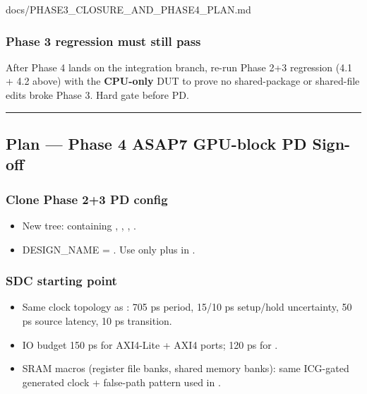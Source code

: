 \begin{relocated}{docs/PHASE3_CLOSURE_AND_PHASE4_PLAN.md}
\subsubsection{Phase 3 regression must still pass}\label{ds:ch:phase3-closure-phase4-plan:66-phase-3-regression-must-still-pass}

After Phase 4 lands on the integration branch, re-run Phase 2+3
regression (4.1 + 4.2 above) with the \textbf{CPU-only} DUT to prove no
shared-package or shared-file edits broke Phase 3. Hard gate before PD.

\begin{center}\rule{0.5\linewidth}{0.5pt}\end{center}

\subsection{Plan --- Phase 4 ASAP7 GPU-block PD Sign-off}\label{ds:ch:phase3-closure-phase4-plan:7-plan-phase-4-asap7-gpu-block-pd-sign-off}

\subsubsection{Clone Phase 2+3 PD config}\label{ds:ch:phase3-closure-phase4-plan:71-clone-phase-23-pd-config}

\begin{itemize}
\tightlist
\item
  New tree:  containing ,
  , ,
  .
\item
  DESIGN\_\allowbreak{}NAME = . Use only
   plus  in .
\end{itemize}

\subsubsection{SDC starting point}\label{ds:ch:phase3-closure-phase4-plan:72-sdc-starting-point}

\begin{itemize}
\tightlist
\item
  Same clock topology as : 705 ps
  period, 15/10 ps setup/\allowbreak{}hold uncertainty, 50 ps source
  latency, 10 ps transition.
\item
  IO budget 150 ps for AXI4-Lite + AXI4 ports; 120 ps for
  .
\item
  SRAM macros (register file banks, shared memory banks): same ICG-gated
   generated clock + false-path pattern used in
  .
\end{itemize}


\end{relocated}
